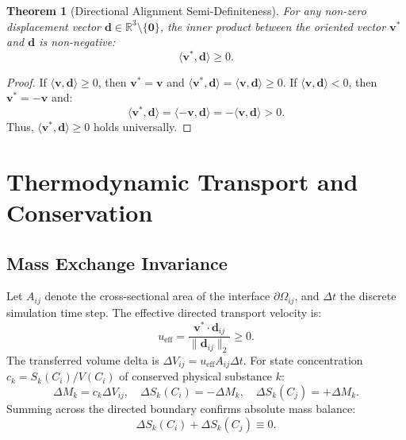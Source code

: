 \documentclass[11pt,a4paper]{article}
\theoremstyle{plain}
\newtheorem{theorem}{Theorem}
\theoremstyle{definition}
\begin{document}
\begin{theorem}[Directional Alignment Semi-Definiteness]
For any non-zero displacement vector $\mathbf{d} \in \mathbb{R}^3 \setminus \{\mathbf{0}\}$, the inner product between the oriented vector $\mathbf{v}^*$ and $\mathbf{d}$ is non-negative:
\begin{equation}
    \langle \mathbf{v}^*, \mathbf{d} \rangle \ge 0.
\end{equation}
\end{theorem}
\begin{proof}
If $\langle \mathbf{v}, \mathbf{d} \rangle \ge 0$, then $\mathbf{v}^* = \mathbf{v}$ and $\langle \mathbf{v}^*, \mathbf{d} \rangle = \langle \mathbf{v}, \mathbf{d} \rangle \ge 0$. If $\langle \mathbf{v}, \mathbf{d} \rangle < 0$, then $\mathbf{v}^* = -\mathbf{v}$ and:
\begin{equation}
    \langle \mathbf{v}^*, \mathbf{d} \rangle = \langle -\mathbf{v}, \mathbf{d} \rangle = - \langle \mathbf{v}, \mathbf{d} \rangle > 0.
\end{equation}
Thus, $\langle \mathbf{v}^*, \mathbf{d} \rangle \ge 0$ holds universally.
\end{proof}

\section{Thermodynamic Transport and Conservation}

\subsection{Mass Exchange Invariance}
Let $A_{ij}$ denote the cross-sectional area of the interface $\partial \Omega_{ij}$, and $\Delta t$ the discrete simulation time step. The effective directed transport velocity is:
\begin{equation}
    u_{\text{eff}} = \frac{\mathbf{v}^* \cdot \mathbf{d}_{ij}}{\|\mathbf{d}_{ij}\|_2} \ge 0.
\end{equation}
The transferred volume delta is $\Delta V_{ij} = u_{\text{eff}} A_{ij} \Delta t$. For state concentration $c_k = S_k(C_i)/V(C_i)$ of conserved physical substance $k$:
\begin{equation}
    \Delta M_k = c_k \Delta V_{ij}, \quad 
    \Delta S_k(C_i) = -\Delta M_k, \quad
    \Delta S_k(C_j) = +\Delta M_k.
\end{equation}
Summing across the directed boundary confirms absolute mass balance:
\begin{equation}
    \Delta S_k(C_i) + \Delta S_k(C_j) \equiv 0.
\end{equation}
\end{document}
